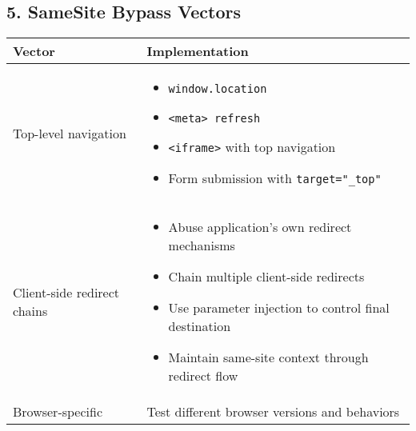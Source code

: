 \documentclass{article}
\begin{document}
\subsection*{5. SameSite Bypass Vectors}
\begin{tabular}{>{\raggedright\arraybackslash}p{}>{\raggedright\arraybackslash}p{}}
    \toprule
    \textbf{Vector} & \textbf{Implementation} \\
    \midrule
    Top-level navigation & 
    \begin{itemize}
        \setlength\itemsep{0em}
        \item \texttt{window.location}
        \item \texttt{<meta> refresh}
        \item \texttt{<iframe>} with top navigation
        \item Form submission with \texttt{target="\_top"}
    \end{itemize} \\
    Client-side redirect chains & 
    \begin{itemize}
        \setlength\itemsep{0em}
        \item Abuse application's own redirect mechanisms
        \item Chain multiple client-side redirects
        \item Use parameter injection to control final destination
        \item Maintain same-site context through redirect flow
    \end{itemize} \\
    Browser-specific & Test different browser versions and behaviors \\
    \bottomrule
\end{tabular}
\end{document}
